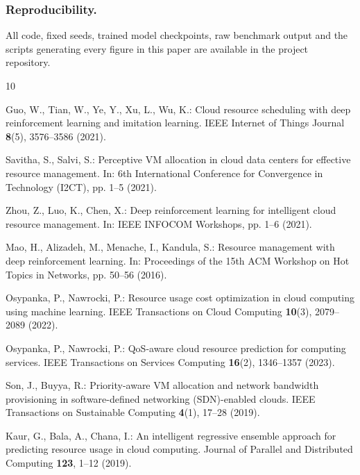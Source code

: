 \documentclass[runningheads]{llncs}
\begin{document}
\subsubsection{Reproducibility.}
All code, fixed seeds, trained model checkpoints, raw benchmark
output and the scripts generating every figure in this paper are
available in the project repository.

\begin{thebibliography}{10}

Guo, W., Tian, W., Ye, Y., Xu, L., Wu, K.: Cloud resource scheduling
with deep reinforcement learning and imitation learning. IEEE Internet
of Things Journal \textbf{8}(5), 3576--3586 (2021).

Savitha, S., Salvi, S.: Perceptive VM allocation in cloud data centers
for effective resource management. In: 6th International Conference
for Convergence in Technology (I2CT), pp. 1--5 (2021).

Zhou, Z., Luo, K., Chen, X.: Deep reinforcement learning for
intelligent cloud resource management. In: IEEE INFOCOM Workshops,
pp. 1--6 (2021). 

Mao, H., Alizadeh, M., Menache, I., Kandula, S.: Resource management
with deep reinforcement learning. In: Proceedings of the 15th ACM
Workshop on Hot Topics in Networks, pp. 50--56 (2016).

Osypanka, P., Nawrocki, P.: Resource usage cost optimization in cloud
computing using machine learning. IEEE Transactions on Cloud Computing
\textbf{10}(3), 2079--2089 (2022). 

Osypanka, P., Nawrocki, P.: QoS-aware cloud resource prediction for
computing services. IEEE Transactions on Services Computing
\textbf{16}(2), 1346--1357 (2023). 

Son, J., Buyya, R.: Priority-aware VM allocation and network bandwidth
provisioning in software-defined networking (SDN)-enabled clouds. IEEE
Transactions on Sustainable Computing \textbf{4}(1), 17--28 (2019).

Kaur, G., Bala, A., Chana, I.: An intelligent regressive ensemble
approach for predicting resource usage in cloud computing. Journal of
Parallel and Distributed Computing \textbf{123}, 1--12 (2019).


\end{thebibliography}
\end{document}
